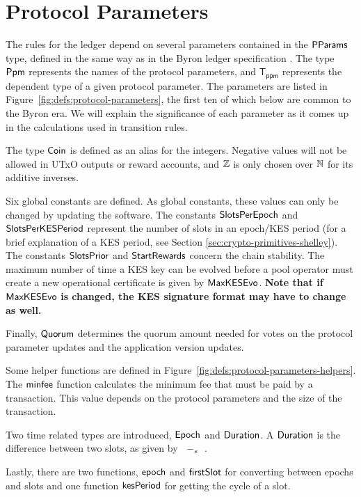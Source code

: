 \section{Protocol Parameters}
\label{sec:protocol-parameters}

The rules for the ledger depend on several parameters contained in the $\mathsf{PParams}$ type,
defined in the same way as in the Byron ledger specification \cite{byron_ledger_spec}.
The type $\mathsf{Ppm}$ represents the names of the protocol parameters,
and $\mathsf{T_{ppm}}$ represents the dependent type of a given protocol parameter.
The parameters are listed in Figure~\ref{fig:defs:protocol-parameters},
the first ten of which below are common to the Byron era.
We will explain the significance of each parameter as it comes up in
the calculations used in transition rules.

The type $\mathsf{Coin}$ is defined as an alias for the integers.
Negative values will not be allowed in UTxO outputs or reward accounts,
and $\mathbb{Z}$ is only chosen over $\mathbb{N}$ for its additive inverses.

Six global constants are defined.
As global constants, these values can only be changed by updating the software.
The constants $\mathsf{SlotsPerEpoch}$ and $\mathsf{SlotsPerKESPeriod}$
represent the number of slots in an epoch/KES period (for a brief explanation
of a KES period, see Section \ref{sec:crypto-primitives-shelley}).
The constants $\mathsf{SlotsPrior}$ and $\mathsf{StartRewards}$ concern the chain stability.
The maximum number of time a KES key can be evolved before a pool operator
must create a new operational certificate is given by $\mathsf{MaxKESEvo}$.
\textbf{Note that if } $\mathsf{MaxKESEvo}$
\textbf{is changed, the KES signature format may have to change as well.}

Finally, $\mathsf{Quorum}$ determines the quorum amount needed for votes on the
protocol parameter updates and the application version updates.


Some helper functions are defined in Figure~\ref{fig:defs:protocol-parameters-helpers}.
The $\mathsf{minfee}$ function calculates the minimum fee that must be paid by a transaction.
This value depends on the protocol parameters and the size of the transaction.

Two time related types are introduced, $\mathsf{Epoch}$ and $\mathsf{Duration}$.
A $\mathsf{Duration}$ is the difference between two slots, as given by $\mathit{}~-_{s}~\mathit{}$.

Lastly, there are two functions, $\mathsf{epoch}$ and $\mathsf{firstSlot}$ for converting
between epochs and slots and one function $\mathsf{kesPeriod}$ for getting the cycle of a slot.

